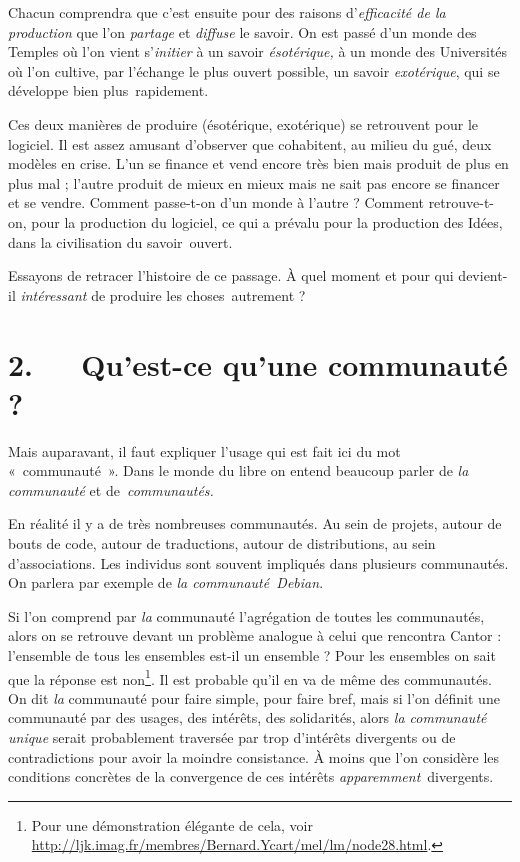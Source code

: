 \documentclass{FramateX}
\begin{document}
\begin{refsection}
Chacun comprendra que c'est ensuite pour des raisons
d'\textit{efficacité de la production} que l'on \textit{partage} et
\textit{diffuse} le savoir. On est passé d'un monde des Temples où l'on
vient s'\textit{initier} à un savoir \textit{ésotérique, }à un monde
des Universités où l'on cultive, par l'échange le plus ouvert possible,
un savoir \textit{exotérique}, qui se développe bien plus~rapidement.

Ces deux manières de produire (ésotérique, exotérique) se retrouvent
pour le logiciel. Il est assez amusant d'observer que cohabitent, au
milieu du gué, deux modèles en crise. L'un se finance et vend encore
très bien mais produit de plus en plus mal ; l'autre produit de mieux
en mieux mais ne sait pas encore se financer et se vendre. Comment
passe-t-on d'un monde à l'autre ? Comment retrouve-t-on, pour la
production du logiciel, ce qui a prévalu pour la production des Idées,
dans la civilisation du savoir~ouvert.

Essayons de retracer l'histoire de ce passage. À quel moment et pour qui
devient-il \textit{intéressant} de produire les choses~autrement ?

\section*{2.~~~Qu'est-ce qu'une communauté ?}
{}

Mais auparavant, il faut expliquer l'usage qui est fait ici du mot
«~communauté~». Dans le monde du libre on entend beaucoup parler de
\textit{la} \textit{communauté} et de~\textit{communautés.}

En réalité il y a de très nombreuses communautés. Au sein de projets,
autour de bouts de code, autour de traductions, autour de
distributions, au sein d'associations. Les individus sont souvent
impliqués dans plusieurs communautés. On parlera par exemple de
\textit{la communauté~Debian}. 

Si l'on comprend par \textit{la} communauté l'agrégation de toutes les
communautés, alors on se retrouve devant un problème analogue à celui
que rencontra Cantor : l'ensemble de tous les ensembles est-il un
ensemble ? Pour les ensembles on sait que la réponse est
non\footnote{Pour une démonstration élégante de cela, voir
\url{http://ljk.imag.fr/membres/Bernard.Ycart/mel/lm/node28.html}.}. Il
est probable qu'il en va de même des communautés. On dit \textit{la}
communauté pour faire simple, pour faire bref, mais si l'on définit une
communauté par des usages, des intérêts, des solidarités, alors
\textit{la communauté unique} serait probablement traversée par trop
d'intérêts divergents ou de contradictions pour avoir la moindre
consistance. À moins que l'on considère les conditions concrètes de la
convergence de ces intérêts \textit{apparemment}~divergents.


\end{refsection}
\end{document}
